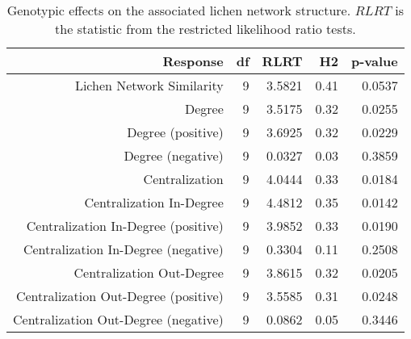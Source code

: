 \begin{table}[ht]
\centering
\begin{tabular}{rrrrr}
  \hline
Response & df & RLRT & H2 & p-value \\ 
  \hline
Lichen Network Similarity & 9 & 3.5821 & 0.41 & 0.0537 \\ 
  Degree & 9 & 3.5175 & 0.32 & 0.0255 \\ 
  Degree (positive) & 9 & 3.6925 & 0.32 & 0.0229 \\ 
  Degree (negative) & 9 & 0.0327 & 0.03 & 0.3859 \\ 
  Centralization & 9 & 4.0444 & 0.33 & 0.0184 \\ 
  Centralization In-Degree & 9 & 4.4812 & 0.35 & 0.0142 \\ 
  Centralization In-Degree (positive) & 9 & 3.9852 & 0.33 & 0.0190 \\ 
  Centralization In-Degree (negative) & 9 & 0.3304 & 0.11 & 0.2508 \\ 
  Centralization Out-Degree & 9 & 3.8615 & 0.32 & 0.0205 \\ 
  Centralization Out-Degree (positive) & 9 & 3.5585 & 0.31 & 0.0248 \\ 
  Centralization Out-Degree (negative) & 9 & 0.0862 & 0.05 & 0.3446 \\ 
   \hline
\end{tabular}
\caption{Genotypic effects on the associated lichen network structure. $RLRT$ is the statistic from the restricted likelihood ratio tests.} 
\label{tab:h2_net}
\end{table}
